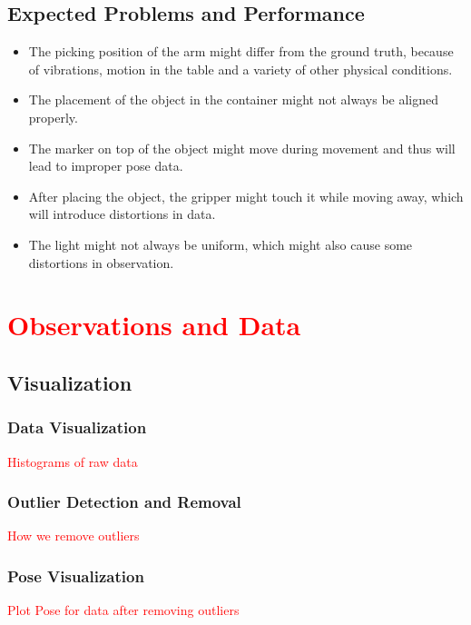 \documentclass[10pt,a4paper]{article}
\begin{document}
				\subsection{Expected Problems and Performance}
					\begin{itemize}
						\item The picking position of the arm might differ from the ground truth, because of vibrations, motion in the table and a variety of other physical conditions.
						\item The placement of the object in the container might not always be aligned properly.
						\item The marker on top of the object might move during movement and thus will lead to improper pose data.
						\item After placing the object, the gripper might touch it while moving away, which will introduce distortions in data.
						\item The light might not always be uniform, which might also cause some distortions in observation.						
					\end{itemize}
					
				\section{\textcolor{red}{Observations and Data}}
					 \subsection{Visualization}
						 \subsubsection{Data Visualization}
							  \textcolor{red}{Histograms of raw data}
	    				 \subsubsection{Outlier Detection and Removal}
		    				 \textcolor{red}{How we remove outliers}
						 \subsubsection{Pose Visualization}
							 \textcolor{red}{Plot Pose for data after removing outliers}				
					
				
\end{document}
